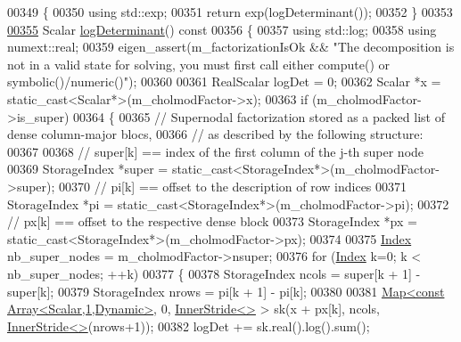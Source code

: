 \begin{DoxyCode}
00349 \textcolor{keyword}{    }\{
00350       \textcolor{keyword}{using} std::exp;
00351       \textcolor{keywordflow}{return} exp(logDeterminant());
00352     \}
00353 
\hyperlink{class_eigen_1_1_cholmod_base_a597f7839a39604af18a8741a0d8c46bf}{00355}     Scalar \hyperlink{class_eigen_1_1_cholmod_base_a597f7839a39604af18a8741a0d8c46bf}{logDeterminant}()\textcolor{keyword}{ const}
00356 \textcolor{keyword}{    }\{
00357       \textcolor{keyword}{using} std::log;
00358       \textcolor{keyword}{using} numext::real;
00359       eigen\_assert(m\_factorizationIsOk && \textcolor{stringliteral}{"The decomposition is not in a valid state for solving, you must
       first call either compute() or symbolic()/numeric()"});
00360 
00361       RealScalar logDet = 0;
00362       Scalar *x = \textcolor{keyword}{static\_cast<}Scalar*\textcolor{keyword}{>}(m\_cholmodFactor->x);
00363       \textcolor{keywordflow}{if} (m\_cholmodFactor->is\_super)
00364       \{
00365         \textcolor{comment}{// Supernodal factorization stored as a packed list of dense column-major blocs,}
00366         \textcolor{comment}{// as described by the following structure:}
00367 
00368         \textcolor{comment}{// super[k] == index of the first column of the j-th super node}
00369         StorageIndex *super = \textcolor{keyword}{static\_cast<}StorageIndex*\textcolor{keyword}{>}(m\_cholmodFactor->super);
00370         \textcolor{comment}{// pi[k] == offset to the description of row indices}
00371         StorageIndex *pi = \textcolor{keyword}{static\_cast<}StorageIndex*\textcolor{keyword}{>}(m\_cholmodFactor->pi);
00372         \textcolor{comment}{// px[k] == offset to the respective dense block}
00373         StorageIndex *px = \textcolor{keyword}{static\_cast<}StorageIndex*\textcolor{keyword}{>}(m\_cholmodFactor->px);
00374 
00375         \hyperlink{namespace_eigen_a62e77e0933482dafde8fe197d9a2cfde}{Index} nb\_super\_nodes = m\_cholmodFactor->nsuper;
00376         \textcolor{keywordflow}{for} (\hyperlink{namespace_eigen_a62e77e0933482dafde8fe197d9a2cfde}{Index} k=0; k < nb\_super\_nodes; ++k)
00377         \{
00378           StorageIndex ncols = super[k + 1] - super[k];
00379           StorageIndex nrows = pi[k + 1] - pi[k];
00380 
00381           \hyperlink{group___core___module_class_eigen_1_1_map}{Map<const Array<Scalar,1,Dynamic>}, 0, 
      \hyperlink{class_eigen_1_1_inner_stride}{InnerStride<>} > sk(x + px[k], ncols, \hyperlink{class_eigen_1_1_inner_stride}{InnerStride<>}(nrows+1));
00382           logDet += sk.real().log().sum();

\end{DoxyCode}
